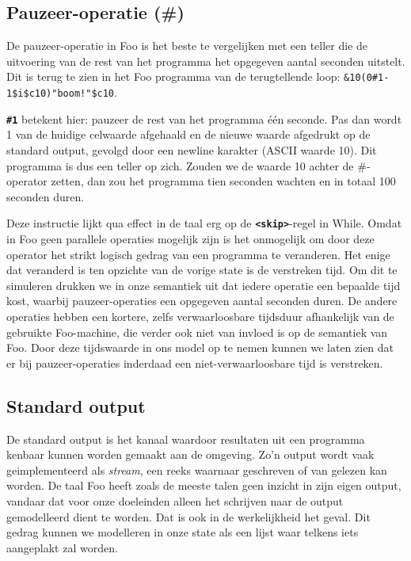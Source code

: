 \documentclass[11pt]{article}
\begin{document}
\subsection{Pauzeer-operatie (\#)}
De pauzeer-operatie in Foo is het beste te vergelijken met een teller die de uitvoering van de rest van het programma het opgegeven aantal seconden uitstelt. 
Dit is terug te zien in het Foo programma van de terugtellende loop: \verb|&10(0#1-1$i$c10)"boom!"$c10|.

{\bf \verb|#1|} betekent hier: pauzeer de rest van het programma \'e\'en seconde. 
Pas dan wordt 1 van de huidige celwaarde afgehaald en de nieuwe waarde afgedrukt op de standard output, gevolgd door een newline karakter (ASCII waarde 10).
Dit programma is dus een teller op zich.
Zouden we de waarde 10 achter de \#-operator zetten, dan zou het programma tien seconden wachten en in totaal 100 seconden duren.

Deze instructie lijkt qua effect in de taal erg op de {\bf\verb|<skip>|}-regel in While.
Omdat in Foo geen parallele operaties mogelijk zijn is het onmogelijk om door deze operator het strikt logisch gedrag van een programma te veranderen.
Het enige dat veranderd is ten opzichte van de vorige state is de verstreken tijd.
Om dit te simuleren drukken we in onze semantiek uit dat iedere operatie een bepaalde tijd kost, waarbij pauzeer-operaties een opgegeven aantal seconden duren.
De andere operaties hebben een kortere, zelfs verwaarloosbare tijdsduur afhankelijk van de gebruikte Foo-machine, die verder ook niet van invloed is op de semantiek van Foo.
Door deze tijdswaarde in ons model op te nemen kunnen we laten zien dat er bij pauzeer-operaties inderdaad een niet-verwaarloosbare tijd is verstreken.

\subsection{Standard output}
De standard output is het kanaal waardoor resultaten uit een programma kenbaar kunnen worden gemaakt aan de omgeving.
Zo'n output wordt vaak geimplementeerd als \textit{stream}, een reeks waarnaar geschreven of van gelezen kan worden.
De taal Foo heeft zoals de meeste talen geen inzicht in zijn eigen output, vandaar dat voor onze doeleinden alleen het schrijven naar de output gemodelleerd dient te worden.
Dat is ook in de werkelijkheid het geval.
Dit gedrag kunnen we modelleren in onze state als een lijst waar telkens iets aangeplakt zal worden.
\end{document}
